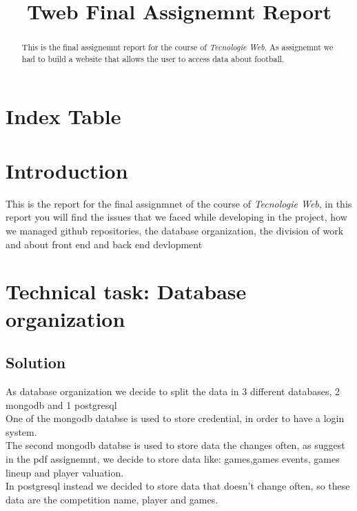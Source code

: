 \documentclass[conference]{IEEEtran}
\begin{document}
\title{Tweb Final Assignemnt Report}

\author{
}

\maketitle

\begin{abstract}
This is the final assignemnt report for the course of \textit{Tecnologie Web}.
As assignemnt we had to build a website that allows the user to  access data about football.
\end{abstract}

\section*{Index Table}
\tableofcontents

\section{Introduction}
This is the report for the final assignmnet of the course of \textit{Tecnologie Web}, 
in this report you will find the issues that we faced while developing in the project, how we managed github repositories, the database organization, the division of work and about front end and back end devlopment

\section{Technical task: Database organization}
\subsection{Solution}
As database organization we decide to split the data in 3 different databases, 2 mongodb and 1 postgresql \\
One of the mongodb databse is used to store credential, in order to have a login system. \\ 
The second mongodb databse is used to store data the changes often, as suggest in the pdf assignemnt, we decide to store data like: games,games events, games lineup and player valuation. \\
In postgresql instead we decided to store data that doesn't change often, so these data are the competition name, player and games.
\end{document}
